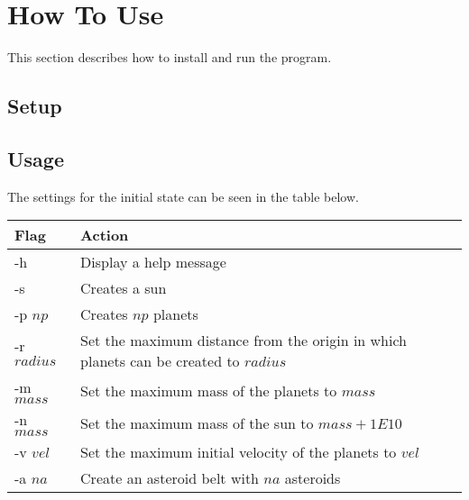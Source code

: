 \documentclass[a4paper,12pt]{article} \usepackage{graphicx}
\begin{document}
\section{How To Use}
This section describes how to install and run the program.
\subsection{Setup}

\subsection{Usage}
The settings for the initial state can be seen in the table below.

\begin{center}
        \begin{tabular}{| l | p{9cm} |}
                \hline
                \textbf{Flag} & \textbf{Action} \\
                \hline
                -h & Display a help message \\
                -s & Creates a sun \\
                -p $np$ & Creates $np$ planets \\
                -r $radius$ & Set the maximum distance from the origin in which planets can be created to $radius$\\
                -m $mass$ & Set the maximum mass of the planets to $mass$\\
                -n $mass$ & Set the maximum mass of the sun to $mass + 1E10$ \\
                -v $vel$ & Set the maximum initial velocity of the planets to $vel$ \\
                -a $na$ & Create an asteroid belt with $na$ asteroids \\
                \hline
        \end{tabular}
\end{center}
\end{document}
